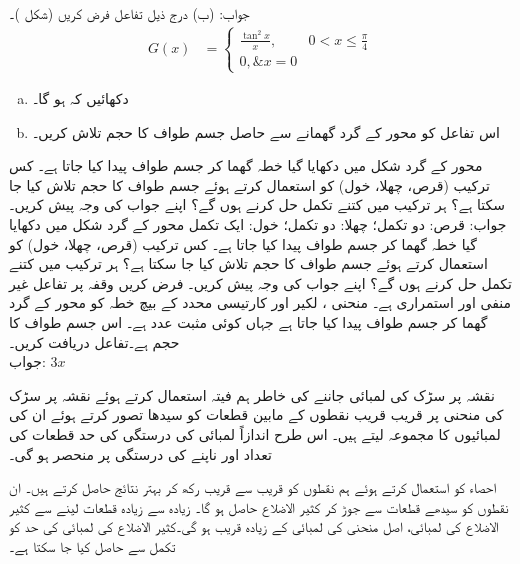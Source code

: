 جواب:\quad
(ب) 
درج ذیل تفاعل فرض کریں (شکل )۔
\begin{align*}
G(x)&=\begin{cases}
\frac{\tan^2 x}{x},& 0<x\le \frac{\pi}{4}\\
0,\& x=0
\end{cases}
\end{align*}
\begin{enumerate}[a.]
\item
دکھائیں کہ  ہو گا۔
\item
اس تفاعل کو  محور کے گرد گھمانے سے حاصل جسم طواف کا حجم تلاش کریں۔
\end{enumerate}
محور  کے گرد شکل  میں دکھایا گیا خطہ گھما کر جسم طواف پیدا کیا جاتا ہے۔ کس ترکیب (قرص، چھلا، خول) کو استعمال کرتے ہوئے جسم طواف کا حجم تلاش کیا جا سکتا ہے؟ ہر ترکیب میں کتنے تکمل حل کرنے ہوں گے؟
 اپنے جواب کی وجہ پیش کریں۔\\
جواب:\quad
قرص: دو تکمل؛ چھلا: دو تکمل؛ خول: ایک تکمل
محور  کے گرد شکل  میں دکھایا گیا خطہ گھما کر جسم طواف پیدا کیا جاتا ہے۔ کس ترکیب (قرص، چھلا، خول) کو استعمال کرتے ہوئے جسم طواف کا حجم تلاش کیا جا سکتا ہے؟ ہر ترکیب میں کتنے تکمل حل کرنے ہوں گے؟ اپنے جواب کی وجہ پیش کریں۔
فرض کریں وقفہ  پر  تفاعل  غیر منفی اور استمراری ہے۔ منحنی ، لکیر  اور کارتیسی محدد کے بیچ خطہ کو  محور کے گرد گھما کر جسم طواف پیدا کیا جاتا ہے جہاں  کوئی مثبت عدد ہے۔ اس جسم طواف کا حجم  ہے۔تفاعل  دریافت کریں۔\\
جواب:\quad
$3x$


نقشہ پر سڑک کی لمبائی جاننے کی خاطر ہم فیتہ استعمال کرتے ہوئے نقشہ پر سڑک کی منحنی پر قریب قریب نقطوں کے مابین قطعات کو سیدھا تصور کرتے ہوئے ان کی لمبائیوں کا مجموعہ لیتے ہیں۔ اس طرح اندازاً لمبائی کی درستگی کی حد قطعات کی تعداد اور ناپنے کی درستگی پر منحصر ہو گی۔ 

احصاء کو استعمال کرتے ہوئے ہم نقطوں کو قریب سے قریب رکھ کر بہتر نتائج حاصل کرتے ہیں۔ ان نقطوں کو سیدھے قطعات سے  جوڑ کر کثیر الاضلاع حاصل ہو گا۔ زیادہ سے زیادہ قطعات لینے سے کثیر الاضلاع کی لمبائی،  اصل منحنی کی لمبائی کے زیادہ قریب ہو گی۔کثیر الاضلاع کی لمبائی کی حد کو تکمل سے حاصل کیا جا سکتا ہے۔

